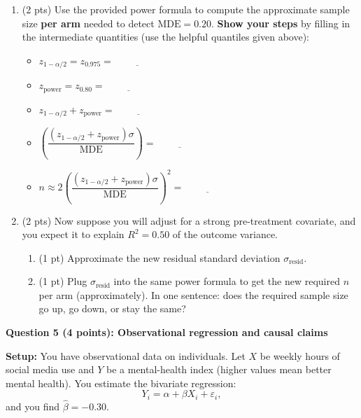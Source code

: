 \documentclass[12pt]{article}
\begin{document}
\begin{enumerate}[label=4\alph*)]
  \item (2 pts) Use the provided power formula to compute the approximate sample size \textbf{per arm} needed to detect $\text{MDE}=0.20$.
  \textbf{Show your steps} by filling in the intermediate quantities (use the helpful quantiles given above):
  \begin{itemize}
    \item $z_{1-\alpha/2}=z_{0.975}=\underline{\hspace{2cm}}$
    \item $z_{\text{power}}=z_{0.80}=\underline{\hspace{2cm}}$
    \item $z_{1-\alpha/2}+z_{\text{power}}=\underline{\hspace{2cm}}$
    \item $\left(\dfrac{(z_{1-\alpha/2}+z_{\text{power}})\sigma}{\text{MDE}}\right)=\underline{\hspace{2cm}}$
    \item $n\approx 2\left(\dfrac{(z_{1-\alpha/2}+z_{\text{power}})\sigma}{\text{MDE}}\right)^2=\underline{\hspace{2cm}}$
  \end{itemize}

  \vspace{0.75em}
  \item (2 pts) Now suppose you will adjust for a strong pre-treatment covariate, and you expect it to explain $R^2=0.50$ of the outcome variance.
  \begin{enumerate}[label=\arabic*.]
    \item (1 pt) Approximate the new residual standard deviation $\sigma_{\text{resid}}$.
    \item (1 pt) Plug $\sigma_{\text{resid}}$ into the same power formula to get the new required $n$ per arm (approximately).
    In one sentence: does the required sample size go up, go down, or stay the same?
  \end{enumerate}
\end{enumerate}

\vspace{1.0em}
\noindent\textbf{Question 5 (4 points): Observational regression and causal claims}

\noindent\textbf{Setup:} You have observational data on individuals. Let $X$ be weekly hours of social media use and
$Y$ be a mental-health index (higher values mean better mental health).
You estimate the bivariate regression:
\[
Y_i=\alpha + \beta X_i + \varepsilon_i,
\]
and you find $\hat\beta=-0.30$.
\end{document}
